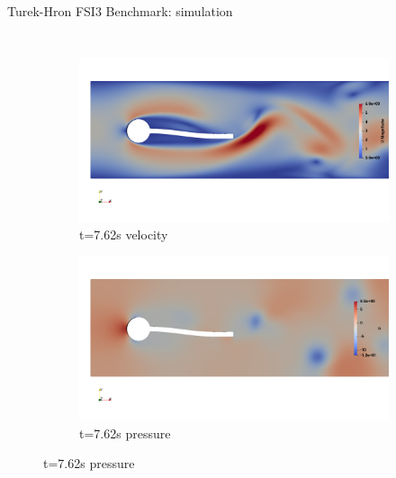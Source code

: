 \documentclass[10pt,t]{beamer}
\begin{document}
\begin{frame}{Turek-Hron FSI3 Benchmark: simulation}
\begin{columns}
\begin{figure}[htb]
\begin{subfigure}{0.5\textwidth}
  \includegraphics[width=\linewidth, trim=0 120 0 120, clip]{images/FSI3/fsi3_v2.png}
  \caption{t=7.62s velocity}
  \label{fig:fsi3_v2}
\end{subfigure}\hfil %
\begin{subfigure}{0.5\textwidth}
  \includegraphics[width=\linewidth, trim=0 120 0 120, clip]{images/FSI3/fsi3_p2.png}
  \caption{t=7.62s pressure}
  \label{fig:fsi3_p2}
\end{subfigure}\hfil %

\medskip


\end{figure}
\end{columns}
\end{frame}
\end{document}
